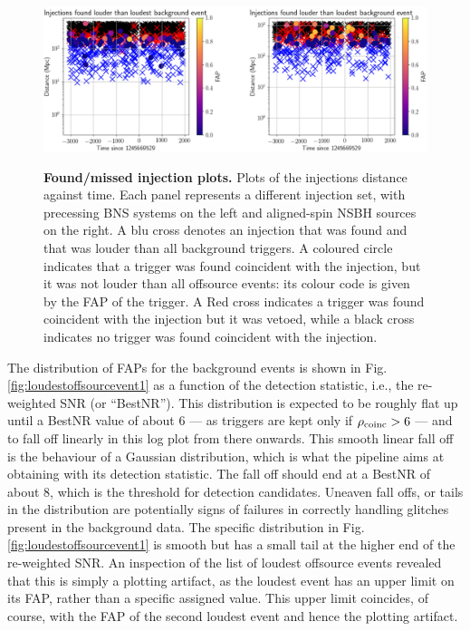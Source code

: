 \documentclass[binding=0.6cm, LaM]{sapthesis}
\begin{document}
        \begin{figure}[!t]
          \noindent
          \label{missinj1}
          \centering
          \includegraphics[width=\textwidth]{missinj1}
          \caption{\textbf{Found/missed injection plots.} Plots of the injections distance against time. Each panel represents a different injection set, with precessing BNS systems on the left and aligned-spin NSBH sources on the right. A blu cross denotes an injection that was found and that was louder than all background triggers. A coloured circle indicates that a trigger was found coincident with the injection, but it was not louder than all offsource events: its colour code is given by the FAP of the trigger.  A Red cross indicates a trigger was found coincident with the injection but it was vetoed, while a black cross indicates no trigger was found coincident with the injection.}
          \label{fig:missinj1}
        \end{figure}

	The distribution of FAPs for the background events is shown in Fig.\,\ref{fig:loudestoffsourcevent1} 
	as a function of the detection statistic, i.e., the re-weighted SNR (or ``BestNR'').
	This distribution is expected to be roughly flat up until a BestNR value of about $6$ 
	--- as triggers are kept only if $\rho_{\rm coinc} > 6$ --- 
	and to fall off linearly in this log plot from there onwards.
	This smooth linear fall off is the behaviour of a Gaussian distribution, 
	which is what the pipeline aims at obtaining with its detection statistic.
	The fall off should end at a BestNR of about $8$, 
	which is the threshold for detection candidates. 
	Uneaven fall offs, or tails in the distribution are potentially signs 
	of failures in correctly handling glitches present in the background data. 
	The specific distribution in Fig.\,\ref{fig:loudestoffsourcevent1} is smooth 
	but has a small tail at the higher end of the re-weighted SNR. 
	An inspection of the list of loudest offsource events revealed that 
	this is simply a plotting artifact, as the loudest event has an upper limit on its FAP, 
	rather than a specific assigned value.
	This upper limit coincides, of course, with the FAP of the second loudest event and hence the plotting artifact.
\end{document}
